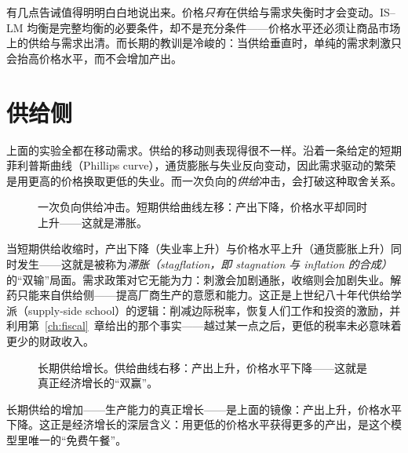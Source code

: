 有几点告诫值得明明白白地说出来。价格\emph{只有}在供给与需求失衡时才会变动。IS--LM 均衡是完整均衡的必要条件，却不是充分条件——价格水平还必须让商品市场上的供给与需求出清。而长期的教训是冷峻的：当供给垂直时，单纯的需求刺激只会抬高价格水平，而不会增加产出。


\section{供给侧}

上面的实验全都在移动需求。供给的移动则表现得很不一样。沿着一条给定的短期菲利普斯曲线（Phillips curve），通货膨胀与失业反向变动，因此需求驱动的繁荣是用更高的价格换取更低的失业。而一次负向的\emph{供给}冲击，会打破这种取舍关系。

\begin{figure}[h]
\centering

\caption{一次负向供给冲击。短期供给曲线左移：产出下降，价格水平却同时上升——这就是滞胀。}
\label{fig:macro-28}
\end{figure}

当短期供给收缩时，产出下降（失业率上升）与价格水平上升（通货膨胀上升）同时发生——这就是被称为\emph{滞胀（stagflation，即 stagnation 与 inflation 的合成）}的“双输”局面。需求政策对它无能为力：刺激会加剧通胀，收缩则会加剧失业。解药只能来自供给侧——提高厂商生产的意愿和能力。这正是上世纪八十年代供给学派（supply-side school）的逻辑：削减边际税率，恢复人们工作和投资的激励，并利用第~\ref{ch:fiscal}~章给出的那个事实——越过某一点之后，更低的税率未必意味着更少的财政收入。

\begin{figure}[h]
\centering

\caption{长期供给增长。供给曲线右移：产出上升，价格水平下降——这就是真正经济增长的“双赢”。}
\label{fig:macro-29}
\end{figure}

长期供给的增加——生产能力的真正增长——是上面的镜像：产出上升，价格水平下降。这正是经济增长的深层含义：用更低的价格水平获得更多的产出，是这个模型里唯一的“免费午餐”。


